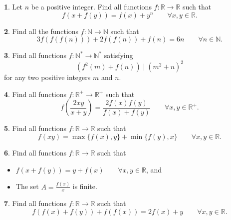 \documentclass{article}
\newcommand{\plus}{+}
\newcommand{\equal}{=}
\theoremstyle{definition}
\newtheorem{p}{}
\begin{document}
\begin{p}
Let $n$ be a positive integer. Find all functions $ f: \mathbb R \to \mathbb R$ such that
\[f(x+f(y))=f(x)+y^n \qquad \forall x,y \in \mathbb R.\]
\end{p}





\begin{p}
Find all the functions $ f: \mathbb{N}\to \mathbb{N}$ such that
\[ 3f(f(f(n))) \plus{} 2f(f(n)) \plus{} f(n) \equal{} 6n \qquad \forall n\in \mathbb{N}.\]
\end{p}



\begin{p}
Find all functions $ f: \mathbb{N^{*}}\to \mathbb{N^{*}}$ satisfying
\[ \left(f^{2}\left(m\right)+f\left(n\right)\right) \mid \left(m^{2}+n\right)^{2}\]
for any two positive integers $ m$ and $ n$.
\end{p}



\begin{p}
Find all functions $ f: \mathbb R^+ \to \mathbb R^+$ such that
\[ f(\frac{2xy}{x\plus{}y})\equal{} \frac{2f(x)f(y)}{f(x)\plus{}f(y)} \qquad \forall x,y \in \mathbb R^+.\]
\end{p}



\begin{p}
Find all functions $ f: \mathbb R \to \mathbb R$ such that
\[f(xy) \equal{} \max\{f(x),y\} \plus{} \min\{f(y),x\} \qquad \forall x,y \in \mathbb R.\]
\end{p}



\begin{p}
Find all functions $ f: \mathbb R \to \mathbb R$ such that
\begin{itemize}
\item $ f(x \plus{} f(y)) \equal{} y \plus{} f(x) \qquad \forall x,y \in \mathbb R$, and 
\item The set $ A \equal{} {\frac {f(x)}{x}}$ is finite.
\end{itemize}
\end{p}





\begin{p}
Find all functions $ f: \mathbb R \to \mathbb R$ such that
\[f(f(x)+f(y))+f(f(x))=2f(x)+y \qquad \forall x,y \in \mathbb R.\]
\end{p}
\end{document}
